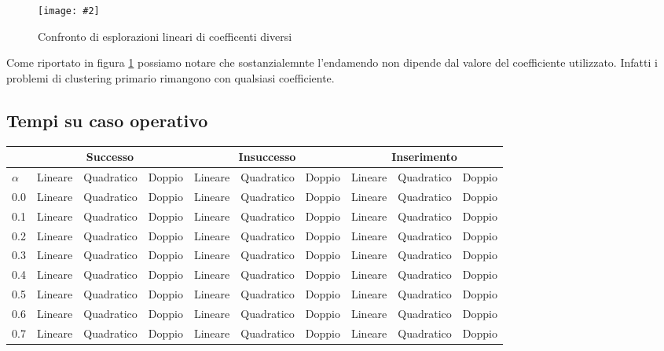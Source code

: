 \documentclass{article}
\newcommand{\image}[3][1]{
	\centering
	\texttt{[image: \#2]}
	\caption{#3}
}
\begin{document}
\begin{figure}[H]
\image[0.75]{Successo_Confronto_Lineare_c1_c5_scala_logaritmica}{Confronto di esplorazioni lineari di coefficenti diversi}
\label{fig:Confronto_coefficienti}
\end{figure}

Come riportato in figura \ref{fig:Confronto_coefficienti} possiamo notare che sostanzialemnte l'endamendo non dipende dal valore del coefficiente utilizzato. Infatti i problemi di clustering primario rimangono con qualsiasi coefficiente.

\subsection{Tempi su caso operativo}

\begin{center}
\begin{table}[H]
\begin{tabular}{l|l|l|l|l|l|l|l|l|l|}
\cline{2-10}
& \multicolumn{3}{c|}{Successo} & \multicolumn{3}{c|}{Insuccesso} & \multicolumn{3}{c|}{Inserimento} \\
\hline
\multicolumn{1}{|l|}{$\alpha$} & Lineare & Quadratico & Doppio & Lineare & Quadratico & Doppio  & Lineare & Quadratico & Doppio \\
\hline
\multicolumn{1}{|l|}{0.0} & Lineare & Quadratico & Doppio & Lineare & Quadratico & Doppio  & Lineare & Quadratico & Doppio \\
\hline
\multicolumn{1}{|l|}{0.1} & Lineare & Quadratico & Doppio & Lineare & Quadratico & Doppio  & Lineare & Quadratico & Doppio \\
\hline
\multicolumn{1}{|l|}{0.2} & Lineare & Quadratico & Doppio & Lineare & Quadratico & Doppio  & Lineare & Quadratico & Doppio \\
\hline
\multicolumn{1}{|l|}{0.3} & Lineare & Quadratico & Doppio & Lineare & Quadratico & Doppio  & Lineare & Quadratico & Doppio \\
\hline
\multicolumn{1}{|l|}{0.4} & Lineare & Quadratico & Doppio & Lineare & Quadratico & Doppio  & Lineare & Quadratico & Doppio \\
\hline
\multicolumn{1}{|l|}{0.5} & Lineare & Quadratico & Doppio & Lineare & Quadratico & Doppio  & Lineare & Quadratico & Doppio \\
\hline
\multicolumn{1}{|l|}{0.6} & Lineare & Quadratico & Doppio & Lineare & Quadratico & Doppio  & Lineare & Quadratico & Doppio \\
\hline
\multicolumn{1}{|l|}{0.7} & Lineare & Quadratico & Doppio & Lineare & Quadratico & Doppio  & Lineare & Quadratico & Doppio \\

\end{tabular}
\end{table}
\end{center}
\end{document}
